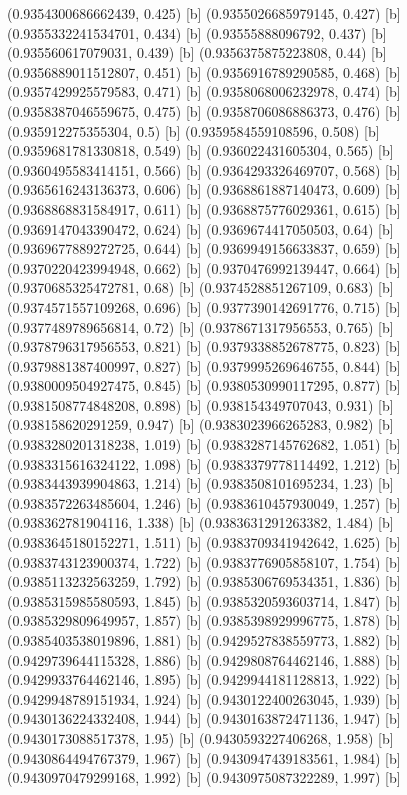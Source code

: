 {{{(0.9354300686662439, 0.425) [b] 
(0.9355026685979145, 0.427) [b] 
(0.9355332241534701, 0.434) [b] 
(0.93555888096792, 0.437) [b] 
(0.935560617079031, 0.439) [b] 
(0.9356375875223808, 0.44) [b] 
(0.9356889011512807, 0.451) [b] 
(0.9356916789290585, 0.468) [b] 
(0.9357429925579583, 0.471) [b] 
(0.9358068006232978, 0.474) [b] 
(0.9358387046559675, 0.475) [b] 
(0.9358706086886373, 0.476) [b] 
(0.935912275355304, 0.5) [b] 
(0.9359584559108596, 0.508) [b] 
(0.9359681781330818, 0.549) [b] 
(0.936022431605304, 0.565) [b] 
(0.9360495583414151, 0.566) [b] 
(0.9364293326469707, 0.568) [b] 
(0.9365616243136373, 0.606) [b] 
(0.9368861887140473, 0.609) [b] 
(0.9368868831584917, 0.611) [b] 
(0.9368875776029361, 0.615) [b] 
(0.9369147043390472, 0.624) [b] 
(0.9369674417050503, 0.64) [b] 
(0.9369677889272725, 0.644) [b] 
(0.9369949156633837, 0.659) [b] 
(0.9370220423994948, 0.662) [b] 
(0.9370476992139447, 0.664) [b] 
(0.9370685325472781, 0.68) [b] 
(0.9374528851267109, 0.683) [b] 
(0.9374571557109268, 0.696) [b] 
(0.9377390142691776, 0.715) [b] 
(0.9377489789656814, 0.72) [b] 
(0.9378671317956553, 0.765) [b] 
(0.9378796317956553, 0.821) [b] 
(0.9379338852678775, 0.823) [b] 
(0.9379881387400997, 0.827) [b] 
(0.9379995269646755, 0.844) [b] 
(0.9380009504927475, 0.845) [b] 
(0.9380530990117295, 0.877) [b] 
(0.9381508774848208, 0.898) [b] 
(0.938154349707043, 0.931) [b] 
(0.938158620291259, 0.947) [b] 
(0.9383023966265283, 0.982) [b] 
(0.9383280201318238, 1.019) [b] 
(0.9383287145762682, 1.051) [b] 
(0.9383315616324122, 1.098) [b] 
(0.9383379778114492, 1.212) [b] 
(0.9383443939904863, 1.214) [b] 
(0.9383508101695234, 1.23) [b] 
(0.9383572263485604, 1.246) [b] 
(0.9383610457930049, 1.257) [b] 
(0.938362781904116, 1.338) [b] 
(0.9383631291263382, 1.484) [b] 
(0.9383645180152271, 1.511) [b] 
(0.9383709341942642, 1.625) [b] 
(0.9383743123900374, 1.722) [b] 
(0.9383776905858107, 1.754) [b] 
(0.9385113232563259, 1.792) [b] 
(0.9385306769534351, 1.836) [b] 
(0.9385315985580593, 1.845) [b] 
(0.9385320593603714, 1.847) [b] 
(0.9385329809649957, 1.857) [b] 
(0.9385398929996775, 1.878) [b] 
(0.9385403538019896, 1.881) [b] 
(0.9429527838559773, 1.882) [b] 
(0.9429739644115328, 1.886) [b] 
(0.9429808764462146, 1.888) [b] 
(0.9429933764462146, 1.895) [b] 
(0.9429944181128813, 1.922) [b] 
(0.9429948789151934, 1.924) [b] 
(0.9430122400263045, 1.939) [b] 
(0.9430136224332408, 1.944) [b] 
(0.9430163872471136, 1.947) [b] 
(0.9430173088517378, 1.95) [b] 
(0.9430593227406268, 1.958) [b] 
(0.9430864494767379, 1.967) [b] 
(0.9430947439183561, 1.984) [b] 
(0.9430970479299168, 1.992) [b] 
(0.9430975087322289, 1.997) [b] 
}}}
